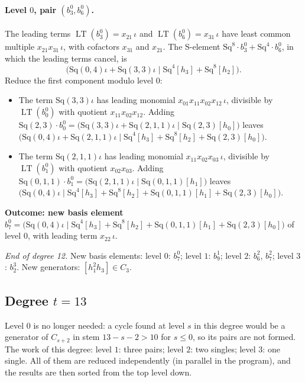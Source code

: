 \documentclass[11pt]{article}
\newcommand{\Sq}{\mathrm{Sq}}
\DeclareMathOperator{\LT}{LT}
\begin{document}
\paragraph{Level $0$, pair $(b^{0}_{3}, b^{0}_{6})$.} The leading terms $\LT(b^{0}_{3}) = x_{21}\,\iota$ and $\LT(b^{0}_{6}) = x_{31}\,\iota$ have least common multiple $x_{21}x_{31}\,\iota$, with cofactors $x_{31}$ and $x_{21}$. The S-element $\Sq^{8}\cdot b^{0}_{3} + \Sq^{4}\cdot b^{0}_{6}$, in which the leading terms cancel, is
\[\bigl(\Sq(0,4)\iota + \Sq(3,3)\iota \;\big|\; \Sq^{4}[h_3] + \Sq^{8}[h_2]\bigr).\]
Reduce the first component modulo level $0$:
\begin{itemize}
\item The term $\Sq(3,3)\iota$ has leading monomial $x_{01}x_{11}x_{02}x_{12}\,\iota$, divisible by $\LT(b^{0}_{0})$ with quotient $x_{11}x_{02}x_{12}$. Adding $\Sq(2,3)\cdot b^{0}_{0} = \bigl(\Sq(3,3)\iota + \Sq(2,1,1)\iota \;\big|\; \Sq(2,3)[h_0]\bigr)$ leaves $\bigl(\Sq(0,4)\iota + \Sq(2,1,1)\iota \;\big|\; \Sq^{4}[h_3] + \Sq^{8}[h_2] + \Sq(2,3)[h_0]\bigr)$.
\item The term $\Sq(2,1,1)\iota$ has leading monomial $x_{11}x_{02}x_{03}\,\iota$, divisible by $\LT(b^{0}_{1})$ with quotient $x_{02}x_{03}$. Adding $\Sq(0,1,1)\cdot b^{0}_{1} = \bigl(\Sq(2,1,1)\iota \;\big|\; \Sq(0,1,1)[h_1]\bigr)$ leaves $\bigl(\Sq(0,4)\iota \;\big|\; \Sq^{4}[h_3] + \Sq^{8}[h_2] + \Sq(0,1,1)[h_1] + \Sq(2,3)[h_0]\bigr)$.
\end{itemize}
\textbf{Outcome: new basis element} $b^{0}_{7} = \bigl(\Sq(0,4)\iota \;\big|\; \Sq^{4}[h_3] + \Sq^{8}[h_2] + \Sq(0,1,1)[h_1] + \Sq(2,3)[h_0]\bigr)$ of level $0$, with leading term $x_{22}\,\iota$.
\medskip
\par\noindent\emph{End of degree 12.} New basis elements: level $0$: $b^{0}_{7}$; level $1$: $b^{1}_{9}$; level $2$: $b^{2}_{6}$, $b^{2}_{7}$; level $3$: $b^{3}_{2}$. New generators: $[h_1^2h_3]\in C_{3}$.
\subsection*{Degree $t = 13$}
\noindent Level $0$ is no longer needed: a cycle found at level $s$ in this degree would be a generator of $C_{s+2}$ in stem $13-s-2 > 10$ for $s \le 0$, so its pairs are not formed.
\noindent The work of this degree: level $1$: three pairs; level $2$: two singles; level $3$: one single. All of them are reduced independently (in parallel in the program), and the results are then sorted from the top level down.
\medskip
\end{document}
